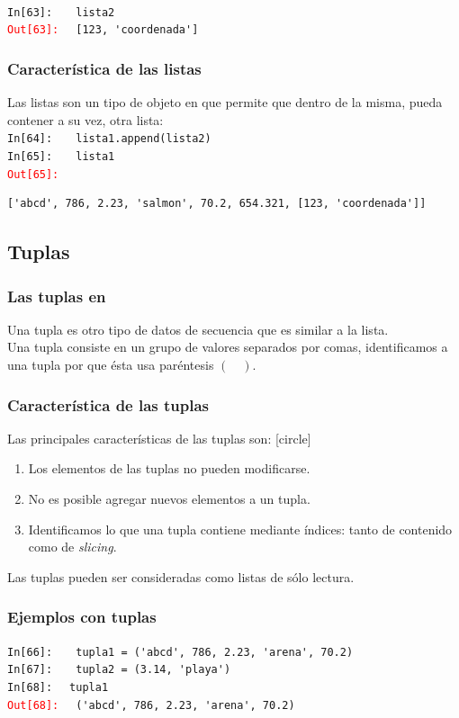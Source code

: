 {\begin{frame}[fragile]
\\
\pause
\textcolor{ao}{\texttt{In[63]: }} \verb|  lista2|
\\
\pause
\textcolor{red}{\texttt{Out[63]: }} \verb| [123, 'coordenada']|
\end{frame}
\begin{frame}[fragile]
\frametitle{Característica de las listas}
Las listas son un tipo de objeto en \python{} que permite que dentro de la misma, pueda contener a su vez, otra lista:
\\
\bigskip
\textcolor{ao}{\texttt{In[64]: }} \verb|  lista1.append(lista2)|
\\
\pause
\textcolor{ao}{\texttt{In[65]: }} \verb|  lista1|
\\
\pause
\textcolor{red}{\texttt{Out[65]: }}  
\begin{lstlisting}
['abcd', 786, 2.23, 'salmon', 70.2, 654.321, [123, 'coordenada']]
\end{lstlisting}
\end{frame}
\subsection{Tuplas}
\begin{frame}
\frametitle{Las tuplas en \python}
Una tupla es otro tipo de datos de secuencia que es similar a la lista.
\\
\bigskip
Una tupla consiste en un grupo de valores separados por comas, identificamos a una tupla por que ésta usa paréntesis $( \quad )$.
\end{frame}
\begin{frame}
\frametitle{Característica de las tuplas}
Las principales características de las tuplas son:
[circle]
\begin{enumerate}[<+->]
\item Los elementos de las tuplas no pueden modificarse.
\item No es posible agregar nuevos elementos a un tupla.
\item Identificamos lo que una tupla contiene mediante índices: tanto de contenido como de \emph{slicing}.
\end{enumerate}
\pause
Las tuplas pueden ser consideradas como listas de sólo lectura.
\end{frame}
\begin{frame}[fragile]
\frametitle{Ejemplos con tuplas}
\textcolor{ao}{\texttt{In[66]: }} \verb|  tupla1 = ('abcd', 786, 2.23, 'arena', 70.2)|
\\
\pause
\textcolor{ao}{\texttt{In[67]: }} \verb|  tupla2 = (3.14, 'playa')|
\\
\bigskip
\pause
\textcolor{ao}{\texttt{In[68]: }} \verb| tupla1|
\\
\textcolor{red}{\texttt{Out[68]: }} \verb| ('abcd', 786, 2.23, 'arena', 70.2)|
\end{frame}

}
